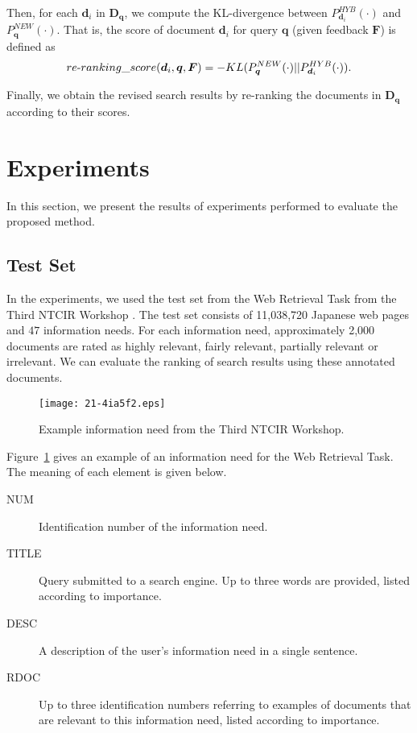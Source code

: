 \documentclass[english]{jnlp_1.4_rep}
\begin{document}
Then, for each $\bm{d}_{i}$ in $\bm{D}_{\bm{q}}$, we compute the
KL-divergence between $P^{HYB}_{\bm{d}_{i}}(\cdot)$ and
$P^{NEW}_{\bm{q}}(\cdot)$. That is, the score of document $\bm{d}_{i}$
for query $\bm{q}$ (given feedback $\bm{F}$) is defined as
\begin{equation}
 re\mathchar`-ranking\_score(\bm{d}_{i},\bm{q},\bm{F})
 =
 - KL(P^{NEW}_{\bm{q}}(\cdot)||P^{HYB}_{\bm{d}_{i}}(\cdot)).
\end{equation}

Finally, we obtain the revised search results by re-ranking the
documents in $\bm{D}_{\bm{q}}$ according to their scores.


\section{Experiments}
\label{sec:experiments}

In this section, we present the results of experiments performed to
evaluate the proposed method.


\subsection{Test Set}
\label{ssec:test_set}

In the experiments, we used the test set from the Web Retrieval Task
from the Third NTCIR Workshop \cite{Eguchi2002}. The test set consists
\linebreak
of 11,038,720 Japanese web pages and $47$ information needs. For each
information need, 
\linebreak
approximately 2,000 documents are rated as highly
relevant, fairly relevant, partially relevant or irrelevant. We can
evaluate the ranking of search results using these annotated documents.

\begin{figure}[b]
 \begin{center}
  \texttt{[image: 21-4ia5f2.eps]}
 \end{center}
  \caption{Example information need from the Third NTCIR Workshop.}
  \label{fig:ntcir_subject}
\end{figure}

Figure~\ref{fig:ntcir_subject} gives an example of an information need
for the Web Retrieval Task. The meaning of each element is given below.
\begin{description}
 \item[NUM] Identification number of the information need.
 \item[TITLE] Query submitted to a search engine. Up to three words are
	    provided, listed according to importance.
 \item[DESC] A description of the user's information need in a single
	    sentence.
 \item[RDOC] Up to three identification numbers referring to examples of
	    documents that are relevant to this information need, listed
	    according to importance.
\end{description}
\end{document}
